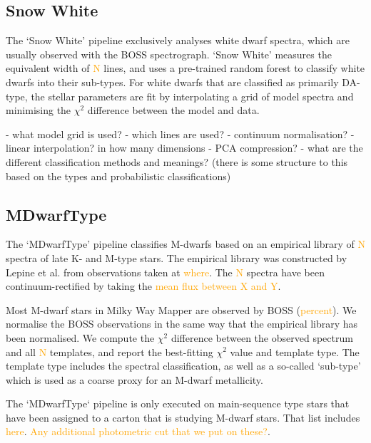 \documentclass[modern]{aastex631}
\newcommand{\todo}[1]{\textcolor{orange}{#1}}
\begin{document}
\subsection{Snow White} \label{sec:methods-snow-white}

The `Snow White' pipeline exclusively analyses white dwarf spectra, which are usually observed with the BOSS 
spectrograph. %
`Snow White' measures the equivalent width of \todo{N} lines, and uses a pre-trained random forest \citep{RF} to classify white dwarfs into their sub-types. For white dwarfs that are classified as primarily DA-type, the stellar parameters are fit by interpolating a grid of \citep{who} model spectra and minimising the $\chi^2$ difference between the model and data.

- what model grid is used?
- which lines are used?
- continuum normalisation?
- linear interpolation? in how many dimensions
- PCA compression?
- what are the different classification methods and meanings? (there is some structure to this based on the types and probabilistic classifications)

\subsection{MDwarfType} \label{sec:methods-m-dwarf-type}

The `MDwarfType' pipeline classifies M-dwarfs based on an empirical library of \todo{N} spectra of late K- and M-type stars. The empirical library was constructed by Lepine et al. from observations taken at \todo{where}. The \todo{N} spectra have been continuum-rectified by taking the \todo{mean flux between X and Y}.

Most M-dwarf stars in Milky Way Mapper are observed by BOSS (\todo{percent}). We normalise the BOSS observations in the same way that the empirical library has been normalised. We compute the $\chi^2$ difference between the observed spectrum and all \todo{N} templates, and report the best-fitting $\chi^2$ value and template type. The template type includes the spectral classification, as well as a so-called `sub-type' which is used as a coarse proxy for an M-dwarf metallicity.

The `MDwarfType` pipeline is only executed on main-sequence type stars that have been assigned to a carton that is studying M-dwarf stars. That list includes \todo{here}. \todo{Any additional photometric cut that we put on these?}.
\end{document}
